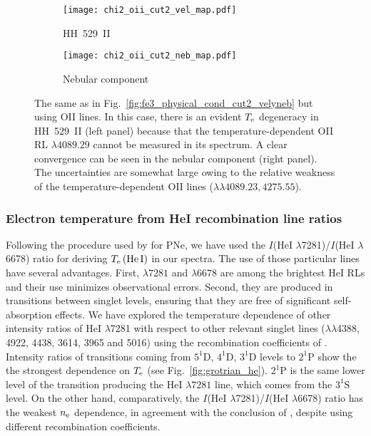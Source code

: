\documentclass[fleqn,usenatbib]{mnras}
\begin{document}
\begin{figure*}
 
    \begin{subfigure}{6cm}
    \centering\texttt{[image: chi2\_oii\_cut2\_vel\_map.pdf]}
    \caption{HH~529~II}
    \label{fig:OII_physical_cond_cut2_velyneb_a}
  \end{subfigure}
  \begin{subfigure}{6cm}
    \centering\texttt{[image: chi2\_oii\_cut2\_neb\_map.pdf]}
    \caption{Nebular component}
    \label{fig:OII_physical_cond_cut2_velyneb_b}
  \end{subfigure}
 \caption{The same as in Fig.~\ref{fig:fe3_physical_cond_cut2_velyneb} but using O\thinspace II lines. In this case, there is an evident  $T_{\rm e}$ degeneracy in HH~529~II (left panel) because that the temperature-dependent O\thinspace II RL $\lambda4089.29$ cannot be measured in its spectrum. A clear convergence can be seen in the nebular component (right panel). The uncertainties are somewhat large owing to the relative weakness of the temperature-dependent O\thinspace II lines ($\lambda \lambda 4089.23,  4275.55$).}
\label{fig:OII_physical_cond_cut2_velyneb}

\end{figure*}




\subsubsection{Electron temperature from He\thinspace I recombination line ratios}
\label{subsubsec:helium_temperature}

Following the procedure used by \citet{Zhang05} for PNe, we have used the $I$(\mbox{He}\thinspace \mbox{I} $\lambda$7281)/$I$(\mbox{He}\thinspace \mbox{I} $\lambda$6678) ratio for deriving $T_{\rm e}\left(\mbox{He}\thinspace \mbox{I} \right)$ in our spectra. The use of those particular lines have se\-ve\-ral advantages. First, $\lambda7281$ and $\lambda6678$ are among the brightest He\thinspace I RLs and their use minimizes observational errors. Second, they are produced in transitions between singlet levels, ensuring that they are free of significant self-absorption effects. We have explored the temperature dependence of other intensity ratios of \mbox{He}\thinspace \mbox{I} $\lambda$7281 with respect to other relevant singlet lines ($\lambda\lambda$4388, 4922, 4438, 3614, 3965 and 5016) using the recombination coefficients of \citet{Porter12,Porter13}. Intensity ratios of transitions coming from $5^1\text{D}$, $4^1\text{D}$, $3^1\text{D}$ levels to $2^1\text{P}$ show the the strongest dependence on $T_{\rm e}$ (see Fig.~\ref{fig:grotrian_he}). $2^1\text{P}$ is the same lower level of the transition producing the \mbox{He}\thinspace \mbox{I} $\lambda 7281$ line, which comes from  the $3^1\text{S}$ level. On the other hand, comparatively, the  $I$(\mbox{He}\thinspace \mbox{I} $\lambda$7281)/$I$(\mbox{He}\thinspace \mbox{I} $\lambda$6678) ratio has the weakest $n_{\rm e}$ dependence, in agreement with the conclusion of \citet{Zhang05}, despite using different recombination coefficients.
\end{document}
